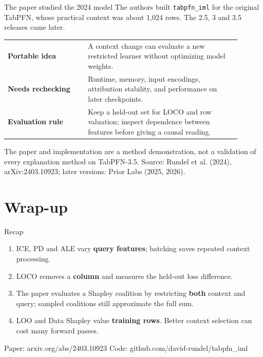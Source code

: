 \documentclass[aspectratio=169]{beamer}
\begin{document}
\begin{frame}{The paper studied the 2024 model}
  \small
  The authors built \texttt{tabpfn\_iml} for the original TabPFN, whose practical
  context was about 1,024 rows. The 2.5, 3 and 3.5 releases came later.
  \vskip 9pt
  \begin{tabular}{L{0.31\linewidth}L{0.59\linewidth}}
    \textbf{Portable idea} & A context change can evaluate a new restricted learner
      without optimizing model weights.\\[7pt]
    \textbf{Needs rechecking} & Runtime, memory, input encodings, attribution
      stability, and performance on later checkpoints.\\[7pt]
    \textbf{Evaluation rule} & Keep a held-out set for LOCO and row valuation;
      inspect dependence between features before giving a causal reading.
  \end{tabular}
  \vskip 8pt
  The paper and implementation are a method demonstration, not a validation
  of every explanation method on TabPFN-3.5.
  \vskip 4pt
  {\scriptsize Source: Rundel et al. (2024), arXiv:2403.10923; later versions: Prior Labs (2025, 2026).}
\end{frame}

\section*{Wrap-up}
\begin{frame}{Recap}
  \small
  \begin{enumerate}\itemsep 7pt
    \item ICE, PD and ALE vary \textbf{query features}; batching saves repeated
      context processing.
    \item LOCO removes a \textbf{column} and measures the held-out loss difference.
    \item The paper evaluates a Shapley coalition by restricting \textbf{both}
      context and query; sampled coalitions still approximate the full sum.
    \item LOO and Data Shapley value \textbf{training rows}. Better context
      selection can cost many forward passes.
  \end{enumerate}
  \vskip 8pt
  \vskip 7pt
  {\scriptsize Paper: arxiv.org/abs/2403.10923 \quad Code: github.com/david-rundel/tabpfn\_iml}
\end{frame}
\end{document}
